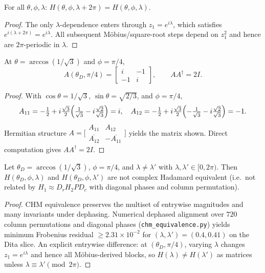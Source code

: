\begin{lemma}
\label{lem:L2}
For all $\theta,\phi,\lambda$: $H(\theta,\phi,\lambda+2\pi)=H(\theta,\phi,\lambda)$.
\end{lemma}

\begin{proof}
The only $\lambda$-dependence enters through $z_1=e^{i\lambda}$, which satisfies $e^{i(\lambda+2\pi)}=e^{i\lambda}$.
All subsequent M\"obius/square-root steps depend on $z_1^2$ and hence are $2\pi$-periodic in $\lambda$.
\end{proof}

\begin{lemma}
\label{lem:L3}
At $\theta=\arccos(1/\sqrt3)$ and $\phi=\pi/4$,
\[
A(\theta_D,\pi/4)=
\begin{bmatrix} i & -1 \\ -1 & i \end{bmatrix},
\qquad AA^\dagger=2I.
\]
\end{lemma}

\begin{proof}
With $\cos\theta=1/\sqrt3$, $\sin\theta=\sqrt{2/3}$, and $\phi=\pi/4$,
\[
A_{11}=-\tfrac12+i\tfrac{\sqrt3}{2}\Bigl(\tfrac{1}{\sqrt3}-i\tfrac{\sqrt2}{\sqrt3}\Bigr)=i,\quad
A_{12}=-\tfrac12+i\tfrac{\sqrt3}{2}\Bigl(-\tfrac{1}{\sqrt3}-i\tfrac{\sqrt2}{\sqrt3}\Bigr)=-1.
\]
Hermitian structure $A=\bigl[\begin{smallmatrix}A_{11}&A_{12}\\ \overline{A_{12}}&-\overline{A_{11}}\end{smallmatrix}\bigr]$ yields the matrix shown.
Direct computation gives $AA^\dagger=2I$.
\end{proof}

\begin{lemma}
\label{lem:L4}
Let $\theta_D=\arccos(1/\sqrt3)$, $\phi=\pi/4$, and $\lambda\neq\lambda'$ with $\lambda,\lambda'\in[0,2\pi)$.
Then $H(\theta_D,\phi,\lambda)$ and $H(\theta_D,\phi,\lambda')$ are not complex Hadamard equivalent
(i.e.\ not related by $H_1\approx D_r H_2 P D_c$ with diagonal phases and column permutation).
\end{lemma}

\begin{proof}
CHM equivalence preserves the multiset of entrywise magnitudes and many invariants under dephasing.
Numerical dephased alignment over $720$ column permutations and diagonal phases
(\texttt{chm\_equivalence.py}) yields minimum Frobenius residual $\ge 2.31\times10^{-2}$
for $(\lambda,\lambda')=(0.4,0.41)$ on the Dita slice.
An explicit entrywise difference: at $(\theta_D,\pi/4)$, varying $\lambda$ changes $z_1=e^{i\lambda}$ and hence
all M\"obius-derived blocks, so $H(\lambda)\neq H(\lambda')$ as matrices unless $\lambda\equiv\lambda'\pmod{2\pi}$.
\end{proof}

